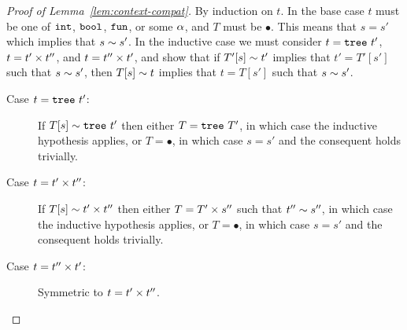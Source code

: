 

\begin{proof}[Proof of Lemma~\ref{lem:context-compat}]



  By induction on $t$.
  In the base case $t$ must be one of $\mathtt{int}$, $\mathtt{bool}$, $\mathtt{fun}$, or
  some $\alpha$, and $T$ must be $\bullet$. This means that $s = s'$
  which implies that $s \sim s'$.
  In the inductive case we must consider
  $t = \mathtt{tree}\ t'$,
  $t = t' \times t''$, and
  $t = t'' \times t'$,
  and show that
  if $T'[s] \sim t'$ implies that $t' = T'[s']$ such that
     $s \sim s'$,
  then $T[s] \sim t$ implies that $t = T[s']$ such that
       $s \sim s'$.
  \begin{description}
  \item[Case $t = \mathtt{tree}\ t'$:]
    If $T[s] \sim \mathtt{tree}\ t'$ then either $T = \mathtt{tree}\ T'$, in
    which case the inductive hypothesis applies, or $T = \bullet$, in
    which case $s = s'$ and the consequent holds trivially.
  \item[Case $t = t' \times t''$:]
    If $T[s] \sim t' \times t''$
    then either $T = T' \times s''$ such that $t'' \sim s''$, in
    which case the inductive hypothesis applies, or $T = \bullet$, in
    which case $s = s'$ and the consequent holds trivially.
  \item[Case $t = t'' \times t'$:] Symmetric to $t = t' \times t''$.
  \end{description}
\end{proof}

